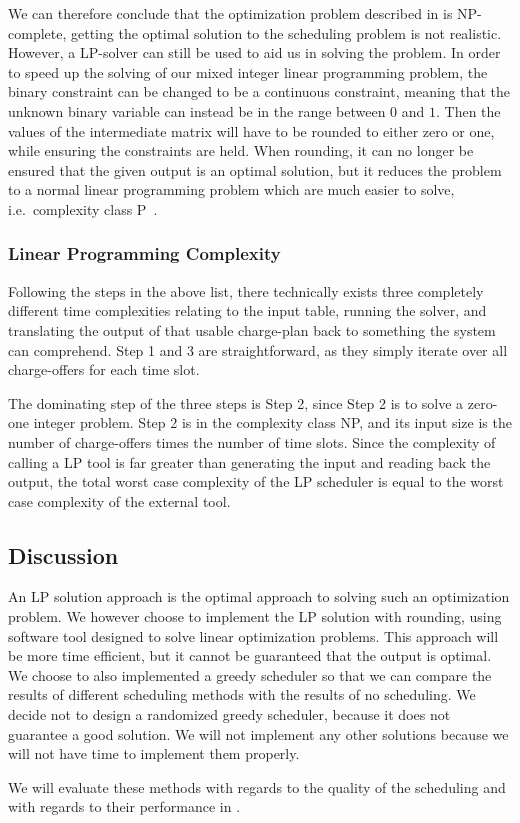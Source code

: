 We can therefore conclude that the optimization problem described in  is NP-complete, getting the optimal solution to the scheduling problem is not realistic. However, a LP-solver can still be used to aid us in solving the problem. In order to speed up the solving of our mixed integer linear programming problem, the binary constraint can be changed to be a continuous constraint, meaning that the unknown binary variable can instead be in the range between $0$ and $1$. Then the values of the intermediate matrix will have to be rounded to either zero or one, while ensuring the constraints are held. When rounding, it can no longer be ensured that the given output is an optimal solution, but it reduces the problem to a normal linear programming problem which are much easier to solve, i.e.\ complexity class P~\cite{LPMS}. 

\subsubsection{Linear Programming Complexity}
Following the steps in the above list, there technically exists three completely different time complexities relating to the input table, running the solver, and translating the output of that usable charge-plan back to something the system can comprehend. Step 1 and 3 are straightforward, as they simply iterate over all charge-offers for each time slot. 

The dominating step of the three steps is Step 2, since Step 2 is to solve a zero-one integer problem. Step 2 is in the complexity class NP, and its input size is the number of charge-offers times the number of time slots. Since the complexity of calling a LP tool is far greater than generating the input and reading back the output, the total worst case complexity of the LP scheduler is equal to the worst case complexity of the external tool.



\subsection{Discussion}
An LP solution approach is the optimal approach to solving such an optimization problem. We however choose to implement the LP solution with rounding, using software tool designed to solve linear optimization problems. This approach will be more time efficient, but it cannot be guaranteed that the output is optimal. We choose to also implemented a greedy scheduler so that we can compare the results of different scheduling methods with the results of no scheduling. We decide not to design a randomized greedy scheduler, because it does not guarantee a good solution. We will not implement any other solutions because we will not have time to implement them properly. 

We will evaluate these methods with regards to the quality of the scheduling and with regards to their performance in .
